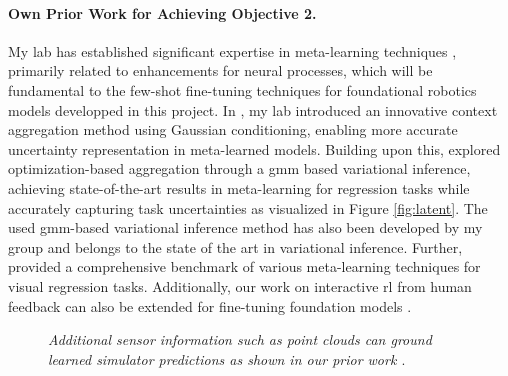 \documentclass{erc-B2}
\begin{document}
\paragraph{Own Prior Work for Achieving Objective 2.} My lab has established significant expertise in meta-learning techniques \cite{volpp2021bayesian, Volpp23, Gao_2022_CVPR}, primarily related to enhancements for neural processes, which will be fundamental to the few-shot fine-tuning techniques for foundational robotics models developped in this project. In \cite{volpp2021bayesian}, my lab introduced an innovative context aggregation method using Gaussian conditioning, enabling more accurate uncertainty representation in meta-learned models. Building upon this, \cite{Volpp23} explored optimization-based aggregation through a \gls*{gmm} based variational inference, achieving state-of-the-art results in meta-learning for regression tasks while accurately capturing task uncertainties as visualized in Figure \ref{fig:latent}. The used \gls*{gmm}-based variational inference method \cite{arenz2022unified,arenz2020trust,arenz2018efficient} has also been developed by my group and belongs to the state of the art in variational inference. 
Further, \cite{Gao_2022_CVPR} provided a comprehensive benchmark of various meta-learning techniques for visual regression tasks. %
Additionally, our work on interactive \gls*{rl} from human feedback can also be extended for fine-tuning foundation models \cite{taranovic2023ailp}. 

\begin{figure}
     \caption{\small \textit{Additional sensor information such as point clouds can ground learned simulator predictions as shown in our prior work \cite{linkerhagnerFSM23}}. 
     }
  \label{wrapfig:object_dynamics_ggns}
\end{figure}
\end{document}
